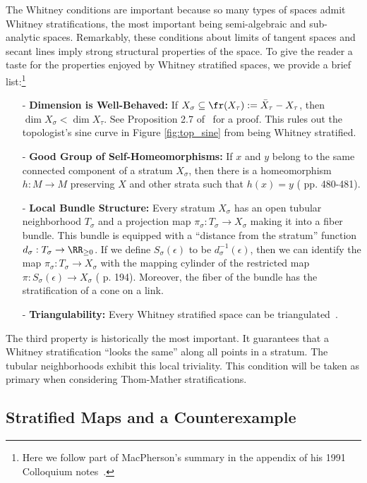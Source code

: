 The Whitney conditions are important because so many types of spaces admit Whitney stratifications, the most important being semi-algebraic and sub-analytic spaces.  Remarkably, these conditions about limits of tangent spaces and secant lines imply strong structural properties of the space. To give the reader a taste for the properties enjoyed by Whitney stratified spaces, we provide a brief list:\footnote{Here we follow part of MacPherson's summary in the appendix of his 1991 Colloquium notes~\cite{macpherson-ih-notes}.}
\begin{itemize}
	\item[-] \textbf{Dimension is Well-Behaved:} If $X_{\sigma}\subseteq \fr(X_{\tau}):=\bar{X}_{\tau}-X_{\tau}$, then $\dim X_{\sigma} < \dim X_{\tau}$. See Proposition 2.7 of~\cite{mather} for a proof. This rules out the topologist's sine curve in Figure \ref{fig:top_sine} from being Whitney stratified.
	\item[-] \textbf{Good Group of Self-Homeomorphisms:} If $x$ and $y$ belong to the same connected component of a stratum $X_{\sigma}$, then there is a homeomorphism $h:M\to M$ preserving $X$ and other strata such that $h(x)=y$ (\cite{mather} pp. 480-481).
	\item[-] \textbf{Local Bundle Structure:} Every stratum $X_{\sigma}$ has an open tubular neighborhood $T_{\sigma}$ and a projection map $\pi_{\sigma}:T_{\sigma}\to X_{\sigma}$ making it into a fiber bundle. This bundle is equipped with a ``distance from the stratum'' function $d_{\sigma}:T_{\sigma}\to\RR_{\geq 0}$. If we define $S_{\sigma}(\epsilon)$ to be $d^{-1}_{\sigma}(\epsilon)$, then we can identify the map $\pi_{\sigma}:T_{\sigma}\to X_{\sigma}$ with the mapping cylinder of the restricted map $\pi:S_{\sigma}(\epsilon)\to X_{\sigma}$ (\cite{goresky-fol} p. 194). Moreover, the fiber of the bundle has the stratification of a cone on a link.
	\item[-] \textbf{Triangulability:} Every Whitney stratified space can be triangulated~\cite{goresky-fol}.
\end{itemize} 

The third property is historically the most important. It guarantees that a Whitney stratification ``looks the same'' along all points in a stratum. The tubular neighborhoods exhibit this local triviality. This condition will be taken as primary when considering Thom-Mather stratifications.

\subsection{Stratified Maps and a Counterexample}
\label{subsubsec:strat_maps}

